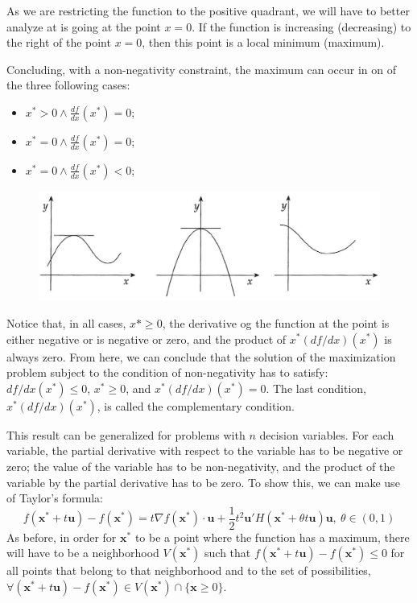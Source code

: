 \documentclass[0pt, a4paper]{article}
\begin{document}
As we are restricting the function to the positive quadrant, we will have to better analyze at is going at the point $x=0$. If the function is increasing (decreasing) to the right of the point $x=0$, then this point is a local minimum (maximum).

Concluding, with a non-negativity constraint, the maximum can occur in on of the three following cases:
\begin{itemize}
	\item $x^*>0\wedge\frac{df}{dx}(x^*)=0$;
	\item $x^*=0\wedge\frac{df}{dx}(x^*)=0$;
	\item $x^*=0\wedge\frac{df}{dx}(x^*)<0$;
\end{itemize}

\begin{figure}[h] \centering \includegraphics[scale=0.3]{images/figure_09_02.png} \end{figure}

Notice that, in all cases, $x*\geq0$, the derivative og the function at the point is either negative or is negative or zero, and the product of $x^*(df/dx)(x^*)$ is always zero. From here, we can conclude that the solution of the maximization problem  subject to the condition of non-negativity has to satisfy: $df/dx(x^*)\leq0$, $x^*\geq0$, and $x^*(df/dx)(x^*)=0$. The last condition, $x^*(df/dx)(x^*)$, is called the complementary condition.

This result can be generalized for problems with $n$ decision variables. For each variable, the partial derivative with respect to the variable has to be negative or zero; the value of the variable has to be non-negativity, and the product of the variable by the partial derivative has to be zero. To show this, we can make use of Taylor's formula:
$$f(\textbf{x}^*+t\textbf{u})-f(\textbf{x}^*)=t\nabla f(\textbf{x}^*)\cdot\textbf{u}+\frac{1}{2}t^2\textbf{u}'H(\textbf{x}^*+\theta t\textbf{u})\textbf{u},\ \theta\in(0,1)$$
As before, in order for $\textbf{x}^*$ to be a point where the function has a maximum, there will have to be a neighborhood $V(\textbf{x}^*)$ such that $f(\textbf{x}^*+t\textbf{u})-f(\textbf{x}^*)\leq0$ for all points that belong to that neighborhood and to the set of possibilities, $\forall(\textbf{x}^*+t\textbf{u})-f(\textbf{x}^*)\in V(\textbf{x}^*)\cap\{\textbf{x}\geq0\}$. 
\end{document}
